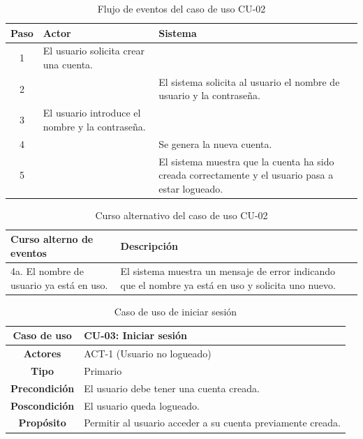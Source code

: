 \begin{table}[H]
\centering
\begin{tabular}{|c|p{5cm}|p{5cm}|}
\hline
\rowcolor{green!40} \textbf{Paso} & \textbf{Actor} & \textbf{Sistema} \\ \hline
\rowcolor{blue!10} 1 & El usuario solicita crear una cuenta. & \\ \hline
\rowcolor{blue!10} 2 & & El sistema solicita al usuario el nombre de usuario y la contraseña. \\ \hline
\rowcolor{blue!10} 3 & El usuario introduce el nombre y la contraseña. & \\ \hline
\rowcolor{blue!10} 4 & & Se genera la nueva cuenta. \\ \hline
\rowcolor{blue!10} 5 & & El sistema muestra que la cuenta ha sido creada correctamente y el usuario pasa a estar logueado. \\ \hline
\end{tabular}
\caption{Flujo de eventos del caso de uso CU-02}
\end{table}

\begin{table}[H]
\centering
\begin{tabular}{|p{4cm}|p{8cm}|}
\hline
\rowcolor{green!40} \textbf{Curso alterno de eventos} & \textbf{Descripción} \\ \hline
\rowcolor{blue!10} 4a. El nombre de usuario ya está en uso. & El sistema muestra un mensaje de error indicando que el nombre ya está en uso y solicita uno nuevo. \\ \hline
\end{tabular}
\caption{Curso alternativo del caso de uso CU-02}
\end{table}

\begin{table}[H]
\centering
\begin{tabular}{|c|p{10cm}|}
\hline
\rowcolor{green!40} \textbf{Caso de uso} & CU-03: Iniciar sesión \\ \hline
\rowcolor{blue!10} \textbf{Actores} & ACT-1 (Usuario no logueado) \\ \hline
\rowcolor{blue!10} \textbf{Tipo} & Primario \\ \hline
\rowcolor{blue!10} \textbf{Precondición} & El usuario debe tener una cuenta creada. \\ \hline
\rowcolor{blue!10} \textbf{Poscondición} & El usuario queda logueado. \\ \hline
\rowcolor{blue!10} \textbf{Propósito} & Permitir al usuario acceder a su cuenta previamente creada. \\ \hline
\end{tabular}
\caption{Caso de uso de iniciar sesión}
\end{table}

